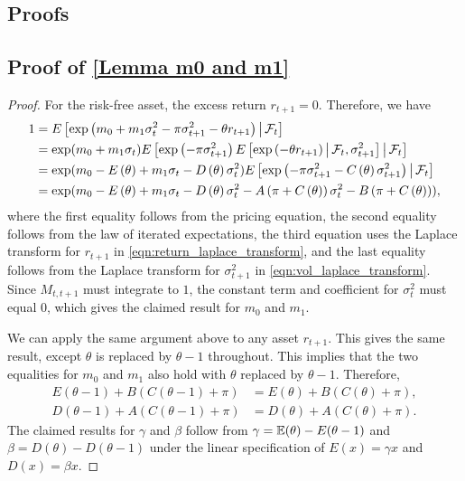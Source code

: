 \documentclass[11pt, letterpaper, twoside]{article}
\begin{document}
\begin{appendices}

\section{Proofs}\label{sec:proofs}


\subsection{\texorpdfstring{Proof of \cref{Lemma m0 and m1}}{Proof of Lemma 1}}

\begin{proof}
For the risk-free asset, the excess return $r_{t+1}=0.$ 
Therefore, we have
%
\begin{align*}
    1 &= E\left[ \exp \left( m_{0}+m_{1}\sigma _{t}^{2}-\pi \sigma _{t+1}^{2}-\theta r_{t+1}\right) \mvert \F_{t}\right]  \\
%
    &= \exp (m_{0}+m_{1}\sigma _{t})E\left[ \exp \left( -\pi \sigma _{t+1}^{2}\right) E\left[ \exp \left( -\theta r_{t+1}\right) \mvert \F _{t},\sigma _{t+1}^{2}\right] \mvert \F_{t}\right]  \\
%
    &= \exp (m_{0}-E\left( \theta \right) +m_{1}\sigma _{t}-D\left( \theta \right) \sigma _{t}^{2})E\left[ \exp \left( -\pi \sigma _{t+1}^{2}-C\left( \theta \right) \sigma _{t+1}^{2}\right) \mvert \F_{t}\right]  \\
%
    &= \exp (m_{0}-E\left( \theta \right) +m_{1}\sigma _{t}-D\left( \theta \right) \sigma _{t}^{2}-A\left( \pi +C\left( \theta \right) \right) \sigma _{t}^{2}-B\left( \pi +C\left( \theta \right) \right) ),
%
\end{align*}
%
where the first equality follows from the pricing equation, the second equality follows from the law of iterated expectations, the third equation uses the Laplace transform for $r_{t+1}$ in \cref{eqn:return_laplace_transform}, and the last equality follows from the Laplace transform for $\sigma _{t+1}^{2}$ in \cref{eqn:vol_laplace_transform}. 
Since $M_{t,t+1}$ must integrate to $1$, the constant term and coefficient for $\sigma_{t}^{2}$ must equal 0, which gives the claimed result for $m_{0}$ and $m_{1}$.

We can apply the same argument above to any asset $r_{t+1}$. This gives the same result, except $\theta$ is replaced by $\theta -1$ throughout. 
This implies that the two equalities for $m_{0}$ and $m_{1}$ also hold with $\theta $ replaced by $\theta -1$. 
Therefore, 
%
\begin{align*}
    E(\theta -1)+B\left( C\left( \theta -1\right) +\pi \right)  
%
    &= E(\theta)+B\left( C\left( \theta \right) +\pi \right) , \\
%
    D\left( \theta -1\right) +A\left( C\left( \theta -1\right) +\pi \right) 
%
    &= D\left( \theta \right) +A\left( C\left( \theta \right) +\pi \right).
\end{align*}
%
The claimed results for $\gamma $ and $\beta $ follow from $\gamma = \operatorname{\mathbb{E}}(\theta)-E(\theta -1)$ and $\beta =D(\theta )-D(\theta -1)$ under the linear specification of $E(x)=\gamma x$ and $D(x)=\beta x$.


\end{proof}
\end{appendices}
\end{document}

